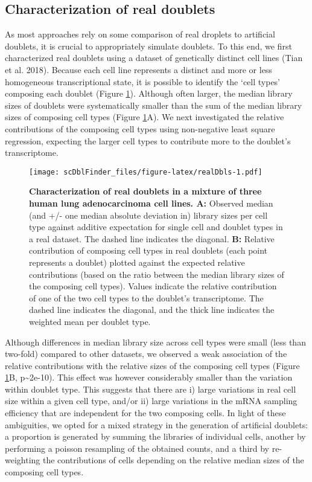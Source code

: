 \documentclass[10pt,a4paper,twocolumn]{article}
\begin{document}
\subsection*{Characterization of real doublets}

As most approaches rely on some comparison of real droplets to artificial doublets, it is crucial to appropriately simulate doublets. To this end, we first characterized real doublets using a dataset of genetically distinct cell lines (Tian et al. 2018). Because each cell line represents a distinct and more or less homogeneous transcriptional state, it is possible to identify the `cell types' composing each doublet (Figure \ref{fig:realDbls}).
Although often larger, the median library sizes of doublets were systematically smaller than the sum of the median library sizes of composing cell types (Figure \ref{fig:realDbls}A).
We next investigated the relative contributions of the composing cell types using non-negative least square regression, expecting the larger cell types to contribute more to the doublet's transcriptome.

\begin{figure}
\centering
\texttt{[image: scDblFinder\_files/figure-latex/realDbls-1.pdf]}
\caption{\label{fig:realDbls}\textbf{Characterization of real doublets in a mixture of three human lung adenocarcinoma cell lines. A:} Observed median (and +/- one median absolute deviation in) library sizes per cell type against additive expectation for single cell and doublet types in a real dataset. The dashed line indicates the diagonal. \textbf{B:} Relative contribution of composing cell types in real doublets (each point represents a doublet) plotted against the expected relative contributions (based on the ratio between the median library sizes of the composing cell types). Values indicate the relative contribution of one of the two cell types to the doublet's transcriptome. The dashed line indicates the diagonal, and the thick line indicates the weighted mean per doublet type.}
\end{figure}


Although differences in median library size across cell types were small (less than two-fold) compared to other datasets, we observed a weak association of the relative contributions with the relative sizes of the composing cell types (Figure \ref{fig:realDbls}B, p\textasciitilde2e-10).
This effect was however considerably smaller than the variation within doublet type.
This suggests that there are
i) large variations in real cell size within a given cell type, and/or
ii) large variations in the mRNA sampling efficiency that are independent for the two composing cells.
In light of these ambiguities, we opted for a mixed strategy in the generation of artificial doublets:
a proportion is generated by summing the libraries of individual cells,
another by performing a poisson resampling of the obtained counts,
and a third by re-weighting the contributions of cells depending on the relative median sizes of the composing cell types.
\end{document}
